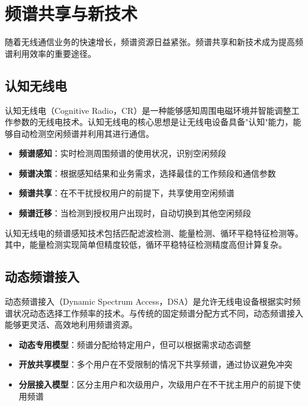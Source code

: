\documentclass[12pt,UTF8]{ctexbook}
\begin{document}
\section{频谱共享与新技术}

随着无线通信业务的快速增长，频谱资源日益紧张。频谱共享和新技术成为提高频谱利用效率的重要途径。

\subsection{认知无线电}

认知无线电（Cognitive Radio，CR）是一种能够感知周围电磁环境并智能调整工作参数的无线电技术。认知无线电的核心思想是让无线电设备具备"认知"能力，能够自动检测空闲频谱并利用其进行通信。

\begin{itemize}[leftmargin=3.5em]
    \item \textbf{频谱感知}：实时检测周围频谱的使用状况，识别空闲频段
    \item \textbf{频谱决策}：根据感知结果和业务需求，选择最佳的工作频段和通信参数
    \item \textbf{频谱共享}：在不干扰授权用户的前提下，共享使用空闲频谱
    \item \textbf{频谱迁移}：当检测到授权用户出现时，自动切换到其他空闲频段
\end{itemize}

认知无线电的频谱感知技术包括匹配滤波检测、能量检测、循环平稳特征检测等。其中，能量检测实现简单但精度较低，循环平稳特征检测精度高但计算复杂。

\subsection{动态频谱接入}

动态频谱接入（Dynamic Spectrum Access，DSA）是允许无线电设备根据实时频谱状况动态选择工作频率的技术。与传统的固定频谱分配方式不同，动态频谱接入能够更灵活、高效地利用频谱资源。

\begin{itemize}[leftmargin=3.5em]
    \item \textbf{动态专用模型}：频谱分配给特定用户，但可以根据需求动态调整
    \item \textbf{开放共享模型}：多个用户在不受限制的情况下共享频谱，通过协议避免冲突
    \item \textbf{分层接入模型}：区分主用户和次级用户，次级用户在不干扰主用户的前提下使用频谱
\end{itemize}
\end{document}
